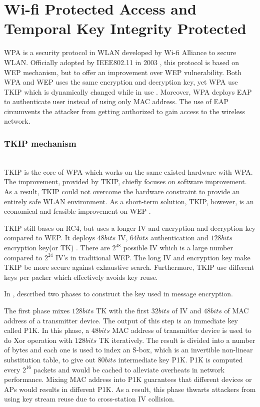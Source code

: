 \section{Wi-fi Protected Access and Temporal Key Integrity Protected}

\ac{WPA} is a security protocol in \ac{WLAN} developed by Wi-fi Alliance to secure \ac{WLAN}. Officially adopted by \ac{IEEE}802.11 in 2003 \cite{1318903}, this protocol is based on \ac{WEP} mechanism, but to offer an improvement over \ac{WEP} vulnerability. Both \ac{WPA} and \ac{WEP} uses the same encryption and decryption key, yet \ac{WPA} use \ac{TKIP} which is dynamically changed while in use \cite{wpa(wi-fiprotectedaccess)definition}. Moreover, \ac{WPA} deploys \ac{EAP} to authenticate user instead of using only \ac{MAC} address. The use of \ac{EAP} circumvents the attacker from getting authorized to gain access to the wireless network.

\subsubsection{TKIP mechanism}~\\
\ac{TKIP} is the core of \ac{WPA} which works on the same existed hardware with \ac{WPA}. The improvement, provided by \ac{TKIP}, chiefly focuses on software improvement. As a result, \ac{TKIP} could not overcome the hardware constraint to provide an entirely safe \ac{WLAN} environment. As a short-term solution, \ac{TKIP}, however, is an economical and feasible improvement on \ac{WEP} \cite{al2006ieee}.

\ac{TKIP} still bases on \ac{RC4}, but uses a longer \ac{IV} and encryption and decryption key compared to \ac{WEP}. It deploys $48 bits$ \ac{IV}, $64 bits$ authentication and $128 bits$ encryption key(or \ac{TK}) \cite{potter2003wireless}. There are $2^{48}$ possible \ac{IV} which is a large number compared to $2^24$ IV's in traditional \ac{WEP}. The long \ac{IV} and encryption key make \ac{TKIP} be more secure against exhaustive search. Furthermore, \ac{TKIP} use different keys per packer which effectively avoids key reuse.

In \cite{doomun2012modified}, \citeauthor{doomun2012modified} described two phases to construct the key used in message encryption.

The first phase mixes $128 bits$ \ac{TK} with the first $32 bits$ of \ac{IV} and $48 bits$ of \ac{MAC} address of a transmitter device. The output of this step is an immediate key called \ac{P1K}. In this phase, a $48 bits$ \ac{MAC} address of transmitter device is used to do \ac{Xor} operation with $128 bits$ \ac{TK} iteratively. The result is divided into a number of bytes and each one is used to index an S-box, which is an invertible non-linear substitution table, to give out $80 bits$ intermediate key \ac{P1K}. \ac{P1K} is computed every $2^{16}$ packets and would be cached to alleviate overheats in network performance. Mixing \ac{MAC} address into \ac{P1K} guarantees that different devices or \ac{AP}s would results in different \ac{P1K}. As a result, this phase thwarts attackers from using key stream reuse due to cross-station \ac{IV} collision. 

